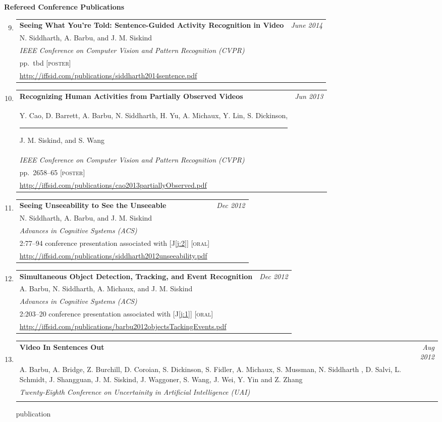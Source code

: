 \documentclass[10pt]{article}
\makeatletter
\newenvironment{benumerate}[2]{
    \let\oldItem\item
    \def\item{\addtocounter{enumi}{-2}\oldItem}
    \begin{enumerate}[#2]
    \setcounter{enumi}{#1}
    \addtocounter{enumi}{1}}
  {\end{enumerate}}
\newenvironment{publication}[5]
{ \item
  \begin{tabular*}{6.5in}{p{5.3in}@{\extracolsep{\fill}}r}
    \textbf{#1} & \textit{#2}\\ #3 &\\ \textit{#4}&\\ #5
  \end{tabular*}
} {}
\newenvironment{region}[3]{%
  \vspace*{0.5ex}
  {\large \textbf{#1}}
  \begin{benumerate}{#3}{\color{RoyalBlue}#2}}
  {\end{benumerate}\vspace{1ex}}
\newcommand{\oral}{{\color{PineGreen}\textsc{oral}}}
\newcommand{\poster}{{\color{BurntOrange}\textsc{poster}}}
\makeatother
\begin{document}
\begin{region} {Refereed Conference Publications}{{C}1}{8}
  \begin{publication} {Seeing What You're Told: Sentence-Guided Activity Recognition in Video}
    {June 2014}
    {N. Siddharth, A. Barbu, and J. M. Siskind}
    {IEEE Conference on Computer Vision and Pattern Recognition (CVPR)}
    {pp.~tbd \hfill\small{[\poster]}\\
      \url{http://iffsid.com/publications/siddharth2014sentence.pdf}}
  \end{publication}
  \begin{publication} {Recognizing Human Activities from Partially Observed Videos}
    {Jun 2013}
    {Y. Cao, D. Barrett, A. Barbu, N. Siddharth, H. Yu, A. Michaux, Y. Lin,
      S. Dickinson, \rule{6ex}{0pt} J. M. Siskind, and S. Wang}
    {IEEE Conference on Computer Vision and Pattern Recognition (CVPR)}
    {pp.~2658--65 \hfill\small{[\poster]}\\ %
      \url{http://iffsid.com/publications/cao2013partiallyObserved.pdf}}
  \end{publication}
  \begin{publication} {Seeing Unseeability to See the Unseeable}
    {Dec 2012}
    {N. Siddharth, A. Barbu, and J. M. Siskind}
    {Advances in Cognitive Systems (ACS)}
    {2:77--94 \hfill\small{conference presentation associated with
        [{\color{RoyalBlue}J\ref{j:2}}] [\oral]}\\ %
      \url{http://iffsid.com/publications/siddharth2012unseeability.pdf}}
  \end{publication}
  \begin{publication} {Simultaneous Object Detection, Tracking, and Event Recognition}
    {Dec 2012}
    {A. Barbu, N. Siddharth, A. Michaux, and J. M. Siskind}
    {Advances in Cognitive Systems (ACS)}
    {2:203--20 \hfill\small{conference presentation associated with
        [{\color{RoyalBlue}J\ref{j:1}}] [\oral]}\\ %
      \url{http://iffsid.com/publications/barbu2012objectsTackingEvents.pdf}}
  \end{publication}
  \begin{publication} {Video In Sentences Out}
    {Aug 2012}
    {A. Barbu, A. Bridge, Z. Burchill, D. Coroian, S. Dickinson, S. Fidler,
      A. Michaux, S. Mussman, N. Siddharth , D. Salvi, L. Schmidt, J. Shangguan,
      J. M. Siskind, J. Waggoner, S. Wang, J. Wei, Y. Yin and Z. Zhang}
    {Twenty-Eighth Conference on Uncertainity in Artificial Intelligence (UAI)}

\end{publication}
\end{region}
\end{document}
